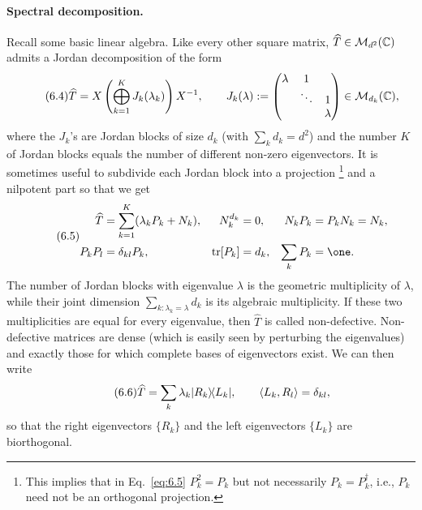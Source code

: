 \documentclass[11pt,a4paper]{article}
\theoremstyle{plain}
\theoremstyle{definition}
\theoremstyle{remark}
\begin{document}
\paragraph{Spectral decomposition.}
Recall some basic linear algebra. Like every other square matrix,
$\widehat{T}\in \mathcal{M}_{d^2}(\mathbb{C})$ admits a Jordan decomposition of the form
\begin{equation}\tag{6.4}\label{eq:6.4}
    \widehat{T}
    = X\left(\bigoplus_{k=1}^K J_k(\lambda_k)\right)X^{-1},
    \qquad
    J_k(\lambda):=
    \begin{pmatrix}
        \lambda &1\\
                &\ddots &1\\
                &       &\lambda
    \end{pmatrix}
    \in \mathcal{M}_{d_k}(\mathbb{C}),
\end{equation}
where the $J_k$'s are Jordan blocks of size $d_k$ (with $\sum_k d_k=d^2$) and the
number $K$ of Jordan blocks equals the number of different non-zero eigenvectors.
It is sometimes useful to subdivide each Jordan block into a projection%
\footnote{This implies that in Eq.~\eqref{eq:6.5} $P_k^2=P_k$ but not necessarily
    $P_k=P_k^\dagger$, i.e., $P_k$ need not be an orthogonal projection.}
and a nilpotent part so that we get
\begin{equation}\tag{6.5}\label{eq:6.5}
    \begin{aligned}
        \widehat{T}
               & = \sum_{k=1}^K (\lambda_k P_k + N_k),
               & N_k^{d_k}                             & =0,
               & N_kP_k                                & = P_kN_k = N_k, \\
        P_kP_l & = \delta_{kl}P_k,
               & \tr[P_k]                              & = d_k,
               & \sum_k P_k                            & = \one.
    \end{aligned}
\end{equation}
The number of Jordan blocks with eigenvalue $\lambda$ is the geometric
multiplicity of $\lambda$, while their joint dimension $\sum_{k:\lambda_k=\lambda} d_k$
is its algebraic multiplicity. If these two multiplicities are equal for every
eigenvalue, then $\widehat{T}$ is called non-defective. Non-defective matrices
are dense (which is easily seen by perturbing the eigenvalues) and exactly those
for which complete bases of eigenvectors exist. We can then write
\begin{equation}\tag{6.6}\label{eq:6.6}
    \widehat{T}=\sum_k \lambda_k |R_k\rangle\!\langle L_k|,
    \qquad
    \langle L_k, R_l\rangle=\delta_{kl},
\end{equation}
so that the right eigenvectors $\{R_k\}$ and the left eigenvectors $\{L_k\}$ are
biorthogonal.
\end{document}
